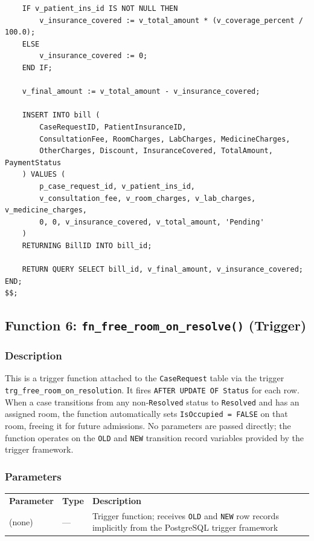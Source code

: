 \documentclass{article}
\newcommand{\theadcell}{\color{white}\bfseries}
\begin{document}
\begin{lstlisting}
    IF v_patient_ins_id IS NOT NULL THEN
        v_insurance_covered := v_total_amount * (v_coverage_percent / 100.0);
    ELSE
        v_insurance_covered := 0;
    END IF;

    v_final_amount := v_total_amount - v_insurance_covered;

    INSERT INTO bill (
        CaseRequestID, PatientInsuranceID,
        ConsultationFee, RoomCharges, LabCharges, MedicineCharges,
        OtherCharges, Discount, InsuranceCovered, TotalAmount, PaymentStatus
    ) VALUES (
        p_case_request_id, v_patient_ins_id,
        v_consultation_fee, v_room_charges, v_lab_charges, v_medicine_charges,
        0, 0, v_insurance_covered, v_total_amount, 'Pending'
    )
    RETURNING BillID INTO bill_id;

    RETURN QUERY SELECT bill_id, v_final_amount, v_insurance_covered;
END;
$$;
\end{lstlisting}



\vspace{1em}

\subsection{Function 6: \texttt{fn\_free\_room\_on\_resolve()} (Trigger)}

\subsubsection{Description}
This is a trigger function attached to the \texttt{CaseRequest} table via the trigger \texttt{trg\_free\_room\_on\_resolution}. It fires \texttt{AFTER UPDATE OF Status} for each row. When a case transitions from any non-\texttt{Resolved} status to \texttt{Resolved} and has an assigned room, the function automatically sets \texttt{IsOccupied = FALSE} on that room, freeing it for future admissions. No parameters are passed directly; the function operates on the \texttt{OLD} and \texttt{NEW} transition record variables provided by the trigger framework.

\subsubsection{Parameters}

\begin{center}
\begin{tabular}{L{4.5cm} L{2.5cm} L{6.5cm}}
   \theadcell Parameter & \theadcell Type & \theadcell Description \\
   (none) & — & Trigger function; receives \texttt{OLD} and \texttt{NEW} row records implicitly from the PostgreSQL trigger framework \\
\end{tabular}
\end{center}
\end{document}
